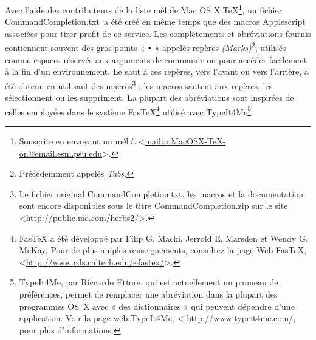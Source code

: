 \documentclass[11pt,french]{article}
\newcommand{\fastex}{Fas\hspace{-.15em}\TeX}
\newcommand{\CCT}{\textsf{CommandCompletion.txt}}
\begin{document}
Avec l'aide des contributeurs de la liste mél de \textsf{Mac OS X TeX}\footnote{Souscrite en envoyant un mél à <\url{mailto:MacOSX-TeX-on@email.esm.psu.edu}>.}, un fichier \CCT\ a été créé en même temps que des macros Applescript associées pour tirer profit de ce service. Les complètements et abréviations fournis contiennent souvent des gros points « \texttt{•} » appelés repères \emph{(Marks)}\footnote{Précédemment appelés \emph{Tabs}.}, utilisés comme espaces réservés aux arguments de commande ou pour accéder facilement à la fin d'un environnement. Le saut à ces repères, vers l'avant ou vers l'arrière, a été obtenu en utilisant des macros\footnote{Le fichier original \CCT, les macros et la documentation sont encore disponibles sous le titre \textsf{CommandCompletion.zip} sur le site <\url{http://public.me.com/herbs2/}>.} ; les macros sautent aux 
repères, les sélectionnent ou les suppriment. La plupart des abréviations sont inspirées de celles employées dans le système \textsf{\fastex}\footnote{\textsf{\fastex} a été développé par Filip G. Machi, Jerrold E. Marsden et Wendy G. McKay. Pour de plus amples renseignements, consultez la page Web \textsf{\fastex}, <\url{http://www.cds.caltech.edu/~fastex/}>.} utilisé avec \textsf{TypeIt4Me}\footnote{\textsf{TypeIt4Me}, par Riccardo Ettore, qui 
est actuellement un panneau de préférences, permet de remplacer une abréviation dans la plupart des programmes 
OS~X avec « des dictionnaires » qui peuvent dépendre d'une application. Voir la page web \textsf{TypeIt4Me}, <
\url{http://www.typeit4me.com/}, pour plus d'informations.}.

\end{document}
